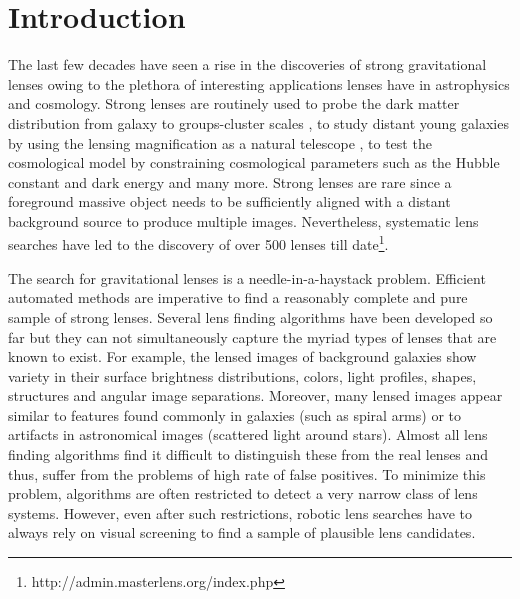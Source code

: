 \documentclass[useAMS,usenatbib,a4paper]{mn2e}
\begin{document}
\setcounter{footnote}{1}


\section{Introduction}
\label{sec:intro}

The last few decades have seen a rise in the discoveries of strong
gravitational lenses owing to the plethora of interesting applications
lenses have in astrophysics and cosmology. Strong lenses are routinely
used to probe the dark matter distribution from galaxy
\citep[e.g.][]{Koopmans2006,Barnabe2009,Sonnenfeld2015} to groups-cluster
scales
\citep[e.g.][]{Limousin2008,Zitrin2011,Oguri2012,More2012,Newman2013}, to
study distant young galaxies by using the lensing magnification as a
natural telescope \citep[e.g.][]{Zitrin2009,Zheng2012,Whitaker2014}, to
test the cosmological model by constraining cosmological parameters such
as the Hubble constant and dark energy
\citep[e.g.][]{Suyu2010,Collett2012,Collett2014,Sereno2014} and many more. Strong
lenses are rare since a foreground massive object needs to be
sufficiently aligned with a distant background source to produce
multiple images. Nevertheless, systematic lens searches have led to the
discovery of over 500 lenses till
date\footnote{http://admin.masterlens.org/index.php}.

The search for gravitational lenses is a needle-in-a-haystack problem.
Efficient automated methods are imperative to find a reasonably complete
and pure sample of strong lenses. Several lens finding algorithms have
been developed so far
\citep[e.g.][]{Lenzen2004,Alard2006,Seidel2007,More2012,Gavazzi2014} but they can not
simultaneously capture the myriad types of lenses that are known to
exist. For example, the lensed images of background galaxies show
variety in their surface brightness distributions, colors, light
profiles, shapes, structures and angular image separations.  Moreover,
many lensed images appear similar to features found commonly in galaxies
(such as spiral arms) or to artifacts in astronomical images (scattered
light around stars).  Almost all lens finding algorithms find it
difficult to distinguish these from the real lenses and thus, suffer
from the problems of high rate of false positives.  To minimize this problem,
algorithms are often restricted to detect a very narrow class of lens
systems. However, even after such restrictions, robotic lens searches
have to always rely on visual screening to find a sample of plausible
lens candidates.
\end{document}
